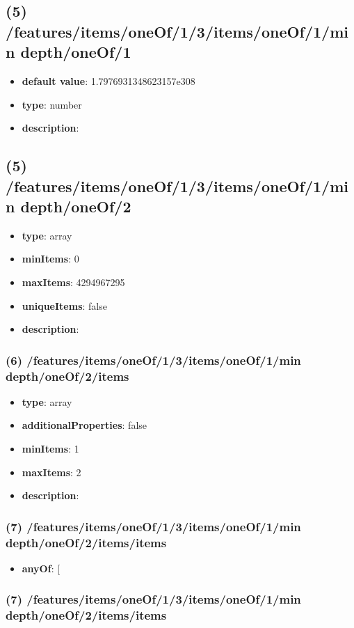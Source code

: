 \subsection{(5) /features/items/oneOf/1/3/items/oneOf/1/min depth/oneOf/1}
\begin{itemize}[leftmargin=5em]\item {\bf default value}: 1.7976931348623157e308
\item {\bf type}: number
\item {\bf description}: 
\end{itemize}\subsection{(5) /features/items/oneOf/1/3/items/oneOf/1/min depth/oneOf/2}
\begin{itemize}[leftmargin=5em]\item {\bf type}: array
\item {\bf minItems}: 0
\item {\bf maxItems}: 4294967295
\item {\bf uniqueItems}: false
\item {\bf description}: 
\end{itemize}\subsubsection{(6) /features/items/oneOf/1/3/items/oneOf/1/min depth/oneOf/2/items}
\begin{itemize}[leftmargin=6em]\item {\bf type}: array
\item {\bf additionalProperties}: false
\item {\bf minItems}: 1
\item {\bf maxItems}: 2
\item {\bf description}: 
\end{itemize}\subsubsection{(7) /features/items/oneOf/1/3/items/oneOf/1/min depth/oneOf/2/items/items}
\begin{itemize}[leftmargin=7em]\item {\bf anyOf}: [\end{itemize}\subsubsection{(7) /features/items/oneOf/1/3/items/oneOf/1/min depth/oneOf/2/items/items}
